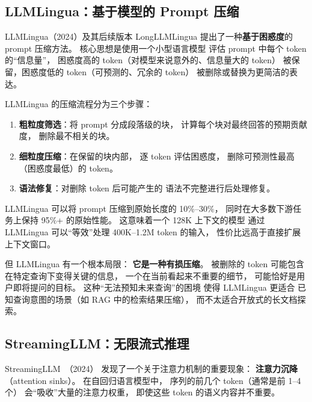 \subsection{LLMLingua：基于模型的 Prompt 压缩}

LLMLingua（2024）及其后续版本 LongLLMLingua%
提出了一种\textbf{基于困惑度}的 prompt 压缩方法。
核心思想是使用一个小型语言模型
评估 prompt 中每个 token 的“信息量”，
困惑度高的 token（对模型来说意外的、信息量大的 token）
被保留，困惑度低的 token（可预测的、冗余的 token）
被删除或替换为更简洁的表达。

LLMLingua 的压缩流程分为三个步骤：
\begin{enumerate}[noitemsep]
  \item \textbf{粗粒度筛选}：将 prompt 分成段落级的块，
        计算每个块对最终回答的预期贡献度，
        删除最不相关的块。
  \item \textbf{细粒度压缩}：在保留的块内部，
        逐 token 评估困惑度，
        删除可预测性最高（困惑度最低）的 token。
  \item \textbf{语法修复}：对删除 token 后可能产生的
        语法不完整进行后处理修复。
\end{enumerate}

LLMLingua 可以将 prompt 压缩到原始长度的 10\%--30\%，
同时在大多数下游任务上保持 95\%+ 的原始性能。
这意味着一个 128K 上下文的模型
通过 LLMLingua 可以“等效”处理 400K--1.2M token 的输入，
性价比远高于直接扩展上下文窗口。

但 LLMLingua 有一个根本局限：
\textbf{它是一种有损压缩}。
被删除的 token 可能包含在特定查询下变得关键的信息，
一个在当前看起来不重要的细节，
可能恰好是用户即将提问的目标。
这种“无法预知未来查询”的困境
使得 LLMLingua 更适合
已知查询意图的场景（如 RAG 中的检索结果压缩），
而不太适合开放式的长文档探索。

\subsection{StreamingLLM：无限流式推理}

StreamingLLM~\cite{xiao2024streamingllm}（2024）%
发现了一个关于注意力机制的重要现象：
\textbf{注意力沉降}（attention sinks）。
在自回归语言模型中，
序列的前几个 token（通常是前 1--4 个）
会“吸收”大量的注意力权重，
即使这些 token 的语义内容并不重要。

